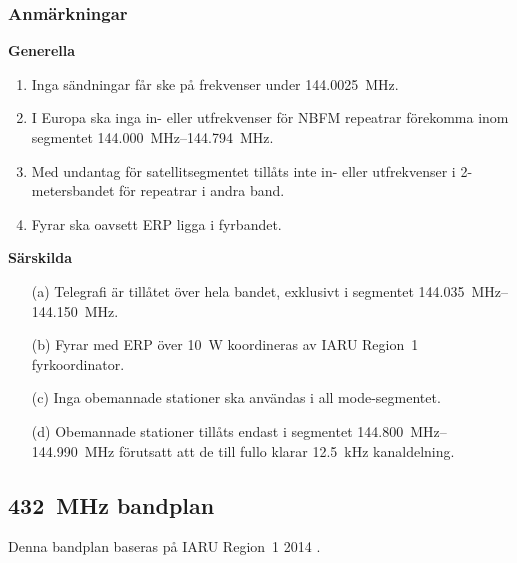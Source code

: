 \subsubsection*{Anmärkningar}

\noindent\textbf{Generella}

\begin{enumerate}[label=\alph*.]
\item Inga sändningar får ske på frekvenser under \qty{144,0025}{\mega\hertz}.
\item I Europa ska inga in- eller utfrekvenser för NBFM repeatrar
  förekomma inom segmentet \SIrange{144,000}{144,794}{\mega\hertz}.
\item Med undantag för satellitsegmentet tillåts inte in- eller
  utfrekvenser i 2-metersbandet för repeatrar i andra band.
\item Fyrar ska oavsett ERP ligga i fyrbandet.
\end{enumerate}

\noindent\textbf{Särskilda}

\begin{itemize}
\item[(a)] Telegrafi är tillåtet över hela bandet, exklusivt i segmentet
  \SIrange{144,035}{144,150}{\mega\hertz}.
\item[(b)] Fyrar med ERP över \qty{10}{\watt} koordineras av IARU Region~1 fyrkoordinator.
\item[(c)] Inga obemannade stationer ska användas i all mode-segmentet.
\item[(d)] Obemannade stationer tillåts endast i segmentet \SIrange{144,800}{144,990}{\mega\hertz}
förutsatt att de till fullo klarar \qty{12,5}{\kilo\hertz} kanaldelning.
\end{itemize}

\newpage

\subsection{\qty{432}{\mega\hertz} bandplan}
\label{432MHzbandplan}
Denna bandplan baseras på IARU Region~1 2014 \cite{IARU1}.

